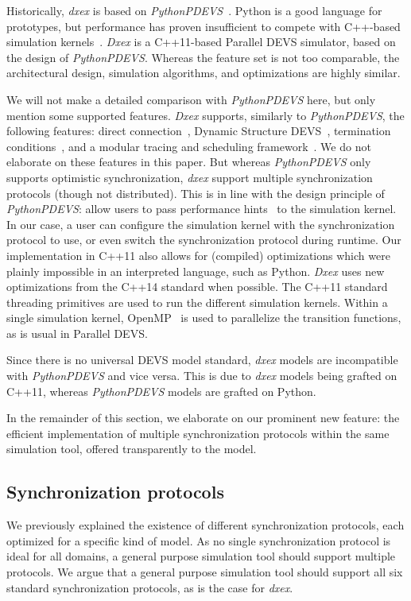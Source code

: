 Historically, \textit{dxex} is based on \textit{PythonPDEVS}~\cite{PythonPDEVS}.
Python is a good language for prototypes, but performance has proven insufficient to compete with C++-based simulation kernels~\cite{MasterThesis}.
\textit{Dxex} is a C++11-based \textsf{Parallel DEVS} simulator, based on the design of \textit{PythonPDEVS}.
Whereas the feature set is not too comparable, the architectural design, simulation algorithms, and optimizations are highly similar.

We will not make a detailed comparison with \textit{PythonPDEVS} here, but only mention some supported features.
\textit{Dxex} supports, similarly to \textit{PythonPDEVS}, the following features: direct connection~\cite{SymbolicFlattening}, \textsf{Dynamic Structure DEVS}~\cite{DSDEVS}, termination conditions~\cite{JDF}, and a modular tracing and scheduling framework~\cite{PythonPDEVS}.
We do not elaborate on these features in this paper.
But whereas \textit{PythonPDEVS} only supports optimistic synchronization, \textit{dxex} support multiple synchronization protocols (though not distributed).
This is in line with the design principle of \textit{PythonPDEVS}: allow users to pass performance hints~\cite{PythonPDEVS_ACTIMS} to the simulation kernel.
In our case, a user can configure the simulation kernel with the synchronization protocol to use, or even switch the synchronization protocol during runtime.
Our implementation in C++11 also allows for (compiled) optimizations which were plainly impossible in an interpreted language, such as Python.
\textit{Dxex} uses new optimizations from the C++14 standard when possible.
The C++11 standard threading primitives are used to run the different simulation kernels.
Within a single simulation kernel, OpenMP~\cite{openmp4} is used to parallelize the transition functions, as is usual in \textsf{Parallel DEVS}.

Since there is no universal \textsf{DEVS} model standard, \textit{dxex} models are incompatible with \textit{PythonPDEVS} and vice versa.
This is due to \textit{dxex} models being grafted on C++11, whereas \textit{PythonPDEVS} models are grafted on Python.

In the remainder of this section, we elaborate on our prominent new feature: the efficient implementation of multiple synchronization protocols within the same simulation tool, offered transparently to the model.

\subsection{Synchronization protocols}
We previously explained the existence of different synchronization protocols, each optimized for a specific kind of model.
As no single synchronization protocol is ideal for all domains, a general purpose simulation tool should support multiple protocols.
We argue that a general purpose simulation tool should support all six standard synchronization protocols, as is the case for \textit{dxex}.

